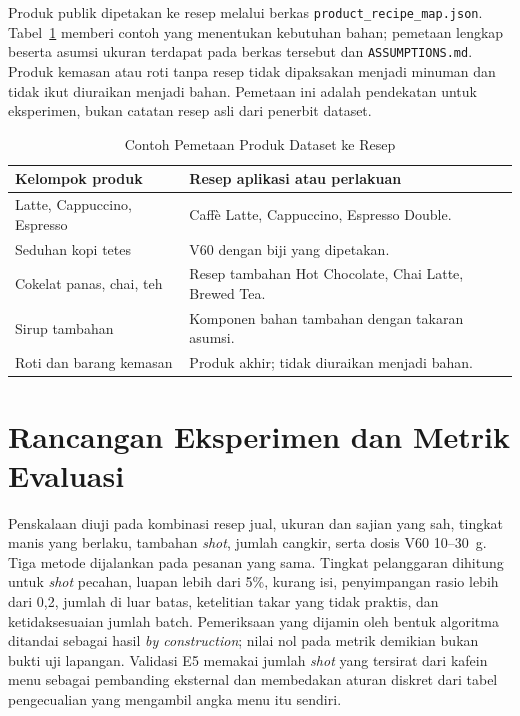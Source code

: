 Produk publik dipetakan ke resep melalui berkas \texttt{product\_recipe\_map.json}. Tabel~\ref{tab:pemetaan-produk} memberi contoh yang menentukan kebutuhan bahan; pemetaan lengkap beserta asumsi ukuran terdapat pada berkas tersebut dan \texttt{ASSUMPTIONS.md}. Produk kemasan atau roti tanpa resep tidak dipaksakan menjadi minuman dan tidak ikut diuraikan menjadi bahan. Pemetaan ini adalah pendekatan untuk eksperimen, bukan catatan resep asli dari penerbit dataset.

\begin{table}[htbp]
\centering
\caption{Contoh Pemetaan Produk Dataset ke Resep}
\label{tab:pemetaan-produk}
\begin{tabular}{p{}p{}}
\toprule
Kelompok produk & Resep aplikasi atau perlakuan \\
\midrule
Latte, Cappuccino, Espresso & Caffè Latte, Cappuccino, Espresso Double. \\
Seduhan kopi tetes & V60 dengan biji yang dipetakan. \\
Cokelat panas, chai, teh & Resep tambahan Hot Chocolate, Chai Latte, Brewed Tea. \\
Sirup tambahan & Komponen bahan tambahan dengan takaran asumsi. \\
Roti dan barang kemasan & Produk akhir; tidak diuraikan menjadi bahan. \\
\bottomrule
\end{tabular}
\end{table}

\section{Rancangan Eksperimen dan Metrik Evaluasi}
\label{sec:rancangan-eksperimen}

Penskalaan diuji pada kombinasi resep jual, ukuran dan sajian yang sah, tingkat manis yang berlaku, tambahan \textit{shot}, jumlah cangkir, serta dosis V60 10--30~g. Tiga metode dijalankan pada pesanan yang sama. Tingkat pelanggaran dihitung untuk \textit{shot} pecahan, luapan lebih dari 5\%, kurang isi, penyimpangan rasio lebih dari 0,2, jumlah di luar batas, ketelitian takar yang tidak praktis, dan ketidaksesuaian jumlah batch. Pemeriksaan yang dijamin oleh bentuk algoritma ditandai sebagai hasil \textit{by construction}; nilai nol pada metrik demikian bukan bukti uji lapangan. Validasi E5 memakai jumlah \textit{shot} yang tersirat dari kafein menu sebagai pembanding eksternal dan membedakan aturan diskret dari tabel pengecualian yang mengambil angka menu itu sendiri.


